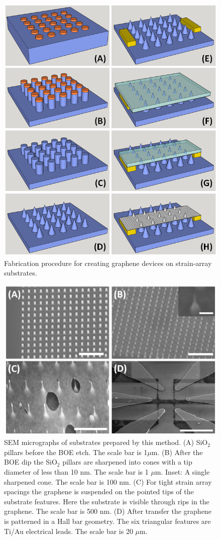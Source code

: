 \documentclass[%
 aip,
 apl,%
 amsmath,amssymb,
 reprint,%
]{revtex4-1}
\begin{document}
\begin{figure}
\centering
\includegraphics[width=0.8\columnwidth]{Figure1}
\caption{Fabrication procedure for creating graphene devices on strain-array substrates.}
\label{'fig:fab'}
\end{figure}

\begin{figure}
\centering
\includegraphics[width=\columnwidth]{Figure2}
\caption{SEM micrographs of substrates prepared by this method. 
(A) SiO$_2$ pillars before the BOE etch. The scale bar is 1$\mu$m.
(B) After the BOE dip the SiO$_2$ pillars are sharpened into cones with a tip diameter of less than 10 nm.
The scale bar is 1 $\mu$m. Inset: A single sharpened cone. The scale bar is 100 nm.
(C) For tight strain array spacings the graphene is suspended on the pointed tips of the substrate features.
Here the substrate is visible through rips in the graphene. The scale bar is 500 nm.
(D) After transfer the graphene is patterned in a Hall bar geometry. The six triangular features are Ti/Au
electrical leads. The scale bar is 20 $\mu$m.}
\label{'fig:sem'}
\end{figure}
\end{document}
